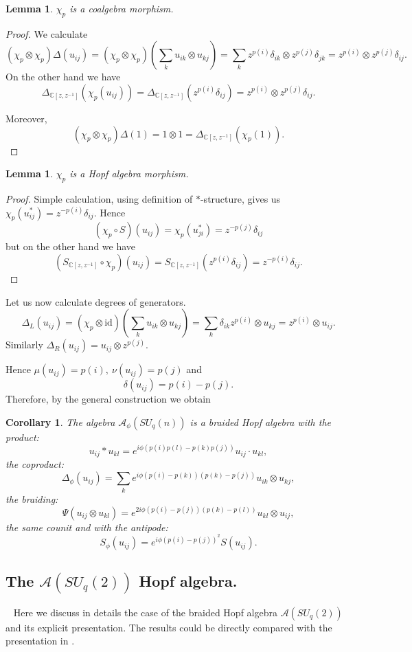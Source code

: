 \documentclass[12pt]{amsart}
\newtheorem{lem}[thm]{Lemma}
\newtheorem{cor}[thm]{Corollary}
\theoremstyle{definition}
\numberwithin{equation}{section}
\newcommand{\A}{\mathcal{A}}        %
\renewcommand{\a}{\chi}             %
\begin{document}
\begin{lem}
$\a_p$ is a coalgebra morphism.
\end{lem}
\begin{proof}
We calculate
$$(\a_p\otimes \a_p)\Delta(u_{ij})=(\a_p\otimes\a_p)\left(\sum\limits_{k} u_{ik}\otimes u_{kj}\right)=
\sum\limits_{k} z^{p(i)} \delta_{ik}\otimes z^{p(j)}\delta_{jk}=z^{p(i)}\otimes z^{p(j)}\delta_{ij}.$$
On the other hand we have 
$$\Delta_{\mathbb{C}[z,z^{-1}]}\left(\a_p(u_{ij})\right)=\Delta_{\mathbb{C}[z,z^{-1}]}\left(z^{p(i)}\delta_{ij}\right)=z^{p(i)}\otimes z^{p(j)}\delta_{ij}.$$

Moreover, 
$$(\a_p \otimes \a_p)\Delta(1)=1\otimes 1=\Delta_{\mathbb{C}[z,z^{-1}]}\left(\a_p(1)\right).$$
\end{proof}


\begin{lem}
$\a_p$ is a Hopf algebra morphism.
\end{lem}
\begin{proof}
Simple calculation, using definition of $\ast$-structure, gives us $\a_p(u_{ij}^{\ast})=z^{-p(i)}\delta_{ij}$. 
Hence 
$$(\a_p\circ S)(u_{ij})=\a_p(u_{ji}^{\ast})=z^{-p(j)}\delta_{ij}$$
but on the other hand we have 
$$\left(S_{\mathbb{C}[z,z^{-1}]}\circ \a_p \right)(u_{ij})=S_{\mathbb{C}[z,z^{-1}]}\left(z^{p(i)}\delta_{ij}\right)=z^{-p(i)}\delta_{ij}.$$
\end{proof}
Let us now calculate degrees of generators.
$$\Delta_L(u_{ij})=(\a_p\otimes \mathrm{id})\left(\sum\limits_{k}u_{ik}\otimes u_{kj}\right)=\sum\limits_{k}\delta_{ik}z^{p(i)}\otimes u_{kj}=z^{p(i)}\otimes u_{ij}.$$
Similarly $\Delta_R(u_{ij})=u_{ij}\otimes z^{p(j)}$.

Hence $\mu(u_{ij})=p(i),\ \nu(u_{ij})=p(j)$ and
$$\delta(u_{ij})=p(i)-p(j).$$
Therefore, by the general construction we obtain
\begin{cor}
The algebra $\A_\phi(SU_q(n))$ is a braided Hopf algebra with the product:
$$ u_{ij}\ast u_{kl} = e^{i\phi\left(p(i)p(l)-p(k)p(j)\right)} u_{ij}\cdot u_{kl}, $$
the coproduct:
$$ \Delta_\phi(u_{ij})=\sum\limits_{k}e^{i\phi\left(p(i)-p(k)\right)\left(p(k)-p(j)\right)}
u_{ik}\otimes u_{kj}, $$
the braiding:
$$ \Psi(u_{ij}\otimes u_{kl})=e^{2 i\phi\left(p(i)-p(j)\right) \left(p(k)-p(l)\right)}
u_{kl}\otimes u_{ij},$$
the same counit and with the antipode:
$$ S_\phi(u_{ij})=e^{i\phi\left(p(i)-p(j)\right)^2}S(u_{ij}). $$
\end{cor}
\subsection{The $\A(SU_q(2))$ Hopf algebra.}
\ \newline
Here we discuss in details the case of the braided Hopf algebra $\mathcal{A}(SU_q(2))$
and its explicit presentation. The results could be directly compared with the
presentation in \cite{KMRW14}.
\end{document}
